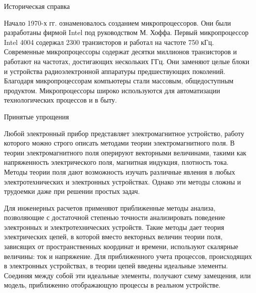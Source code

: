 \documentclass[12pt, pdf, hyperref={unicode},handout]{beamer}
\begin{document}
\begin{frame}{Историческая справка}
  \begin{block}

    \small{

Начало 1970-х гг. ознаменовалось созданием микропроцессоров. Они были разработаны фирмой Intel под руководством М. Хоффа. Первый микропроцессор Intel 4004 содержал 2300 транзисторов и работал на частоте 750 кГц. Современные микропроцессоры содержат десятки миллионов транзисторов и работают на частотах, достигающих нескольких ГГц. Они заменяют целые
блоки и устройства радиоэлектронной аппаратуры предшествующих поколений. Благодаря микропроцессорам компьютеры стали массовым, общедоступным продуктом. Микропроцессоры широко используются для автоматизации технологических процессов и в быту.

}

  \end{block}
  
\end{frame}

\begin{frame}{Принятые упрощения}
  \begin{block}

    \small{
      Любой электронный прибор представляет электромагнитное устройство, работу которого можно строго описать методами теории электромагнитного поля. В теории электромагнитного поля оперируют векторными величинами, такими как напряженность электрического поля, магнитная индукция, плотность тока. Методы теории поля дают возможность изучать различные явления в любых электротехнических и электронных устройствах. Однако эти методы сложны и трудоемки даже при решении простых задач.

      Для инженерных расчетов применяют приближенные методы анализа, позволяющие с достаточной степенью точности анализировать поведение электронных и электротехнических устройств. Такие методы дает теория электрических цепей, в которой вместо векторных величин теории поля, зависящих от пространственных координат и времени, используют скалярные величины: ток и напряжение. Для приближенного учета процессов, происходящих в электронных устройствах, в теории цепей введены идеальные элементы. Соединяя между собой эти идеальные элементы, получают схему замещения, или модель, приближенно отображающую процессы в реальном устройстве.

}

  \end{block}
  
\end{frame}
\end{document}
